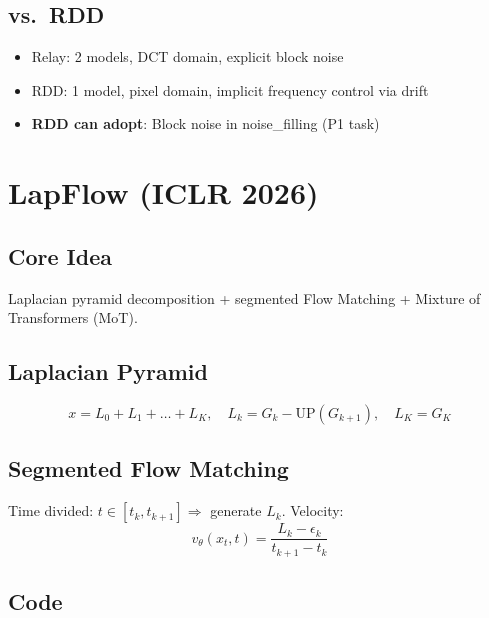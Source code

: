 \documentclass[11pt, a4paper]{article}
\begin{document}
\subsection{vs.\ RDD}

\begin{itemize}
    \item Relay: 2 models, DCT domain, explicit block noise
    \item RDD: 1 model, pixel domain, implicit frequency control via drift
    \item \textbf{RDD can adopt}: Block noise in noise\_filling (P1 task)
\end{itemize}

\newpage
\section{LapFlow (ICLR 2026)}

\subsection{Core Idea}
Laplacian pyramid decomposition + segmented Flow Matching + Mixture of Transformers (MoT).

\subsection{Laplacian Pyramid}

\begin{equation}
    x = L_0 + L_1 + \ldots + L_K, \quad L_k = G_k - \mathrm{UP}(G_{k+1}), \quad L_K = G_K
\end{equation}

\subsection{Segmented Flow Matching}

Time divided: $t \in [t_k, t_{k+1}] \Rightarrow$ generate $L_k$. Velocity:
\begin{equation}
    v_\theta(x_t, t) = \frac{L_k - \epsilon_k}{t_{k+1} - t_k}
\end{equation}

\subsection{Code}
\end{document}
